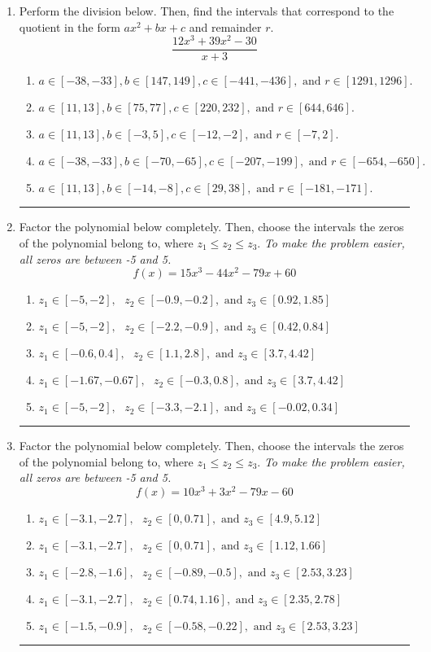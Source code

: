 \documentclass[14pt]{extbook}
\newcommand{\litem}[1]{\item#1\hspace*{-1cm}\rule{\textwidth}{0.4pt}}
\begin{document}
\begin{enumerate}
\litem{
Perform the division below. Then, find the intervals that correspond to the quotient in the form $ax^2+bx+c$ and remainder $r$.\[ \frac{12x^{3} +39 x^{2} -30}{x + 3} \]\begin{enumerate}[label=\Alph*.]
\item \( a \in [-38, -33], b \in [147, 149], c \in [-441, -436], \text{ and } r \in [1291, 1296]. \)
\item \( a \in [11, 13], b \in [75, 77], c \in [220, 232], \text{ and } r \in [644, 646]. \)
\item \( a \in [11, 13], b \in [-3, 5], c \in [-12, -2], \text{ and } r \in [-7, 2]. \)
\item \( a \in [-38, -33], b \in [-70, -65], c \in [-207, -199], \text{ and } r \in [-654, -650]. \)
\item \( a \in [11, 13], b \in [-14, -8], c \in [29, 38], \text{ and } r \in [-181, -171]. \)

\end{enumerate} }
\litem{
Factor the polynomial below completely. Then, choose the intervals the zeros of the polynomial belong to, where $z_1 \leq z_2 \leq z_3$. \textit{To make the problem easier, all zeros are between -5 and 5.}\[ f(x) = 15x^{3} -44 x^{2} -79 x + 60 \]\begin{enumerate}[label=\Alph*.]
\item \( z_1 \in [-5, -2], \text{   }  z_2 \in [-0.9, -0.2], \text{   and   } z_3 \in [0.92, 1.85] \)
\item \( z_1 \in [-5, -2], \text{   }  z_2 \in [-2.2, -0.9], \text{   and   } z_3 \in [0.42, 0.84] \)
\item \( z_1 \in [-0.6, 0.4], \text{   }  z_2 \in [1.1, 2.8], \text{   and   } z_3 \in [3.7, 4.42] \)
\item \( z_1 \in [-1.67, -0.67], \text{   }  z_2 \in [-0.3, 0.8], \text{   and   } z_3 \in [3.7, 4.42] \)
\item \( z_1 \in [-5, -2], \text{   }  z_2 \in [-3.3, -2.1], \text{   and   } z_3 \in [-0.02, 0.34] \)

\end{enumerate} }
\litem{
Factor the polynomial below completely. Then, choose the intervals the zeros of the polynomial belong to, where $z_1 \leq z_2 \leq z_3$. \textit{To make the problem easier, all zeros are between -5 and 5.}\[ f(x) = 10x^{3} +3 x^{2} -79 x -60 \]\begin{enumerate}[label=\Alph*.]
\item \( z_1 \in [-3.1, -2.7], \text{   }  z_2 \in [0, 0.71], \text{   and   } z_3 \in [4.9, 5.12] \)
\item \( z_1 \in [-3.1, -2.7], \text{   }  z_2 \in [0, 0.71], \text{   and   } z_3 \in [1.12, 1.66] \)
\item \( z_1 \in [-2.8, -1.6], \text{   }  z_2 \in [-0.89, -0.5], \text{   and   } z_3 \in [2.53, 3.23] \)
\item \( z_1 \in [-3.1, -2.7], \text{   }  z_2 \in [0.74, 1.16], \text{   and   } z_3 \in [2.35, 2.78] \)
\item \( z_1 \in [-1.5, -0.9], \text{   }  z_2 \in [-0.58, -0.22], \text{   and   } z_3 \in [2.53, 3.23] \)


\end{enumerate}}
\end{enumerate}
\end{document}
